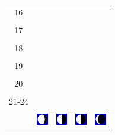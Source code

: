 \documentclass[twoside, a4paper,12pt, tikz]{scrartcl}
\begin{document}
\begin{tabularx}{\linewidth}{|c|X|X|p{2cm}|p{2cm}|}
            &   &       &    &   \\
          \hline
          16&   &                 &    &   \\
            &   &       &    &   \\
          \hline
          17&   &                 &    &   \\
            &   &       &    &   \\
          \hline
          18&   &                 &    &   \\
            &   &       &    &   \\
          \hline
          19&   &                 &     &   \\
            &   &       &    &   \\
          \hline
          20&   &              &    &   \\
            &   &       &    &   \\
          \hline 
          21-24&   &              &    &   \\
            &   &       &    &   \\
          \hline
                      & \vspace{0.01cm} \centerline{\includegraphics[width=0.5cm]{moon_phases/Moon_phase_5.svg.png}} \vspace{0.1cm} & \vspace{0.01cm} \centerline{\includegraphics[width=0.5cm]{moon_phases/Moon_phase_6.svg.png}} \vspace{0.1cm} & \vspace{0.01cm} \centerline{\includegraphics[width=0.5cm]{moon_phases/Moon_phase_6.svg.png}} \vspace{0.1cm} & \vspace{0.01cm} \centerline{\includegraphics[width=0.5cm]{moon_phases/Moon_phase_7.svg.png}} \vspace{0.1cm}\\
          \hline    
        \end{tabularx}
\end{document}
